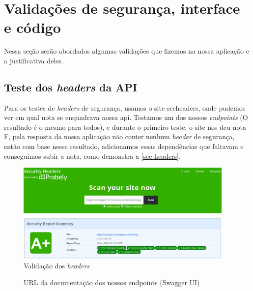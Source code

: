 \section{Validações de segurança, interface e código}
Nessa seção serão abordados algumas validações que fizemos na nossa aplicação e a justificativa deles.

\subsection{Teste dos \emph{headers} da API}
Para os testes de \emph{headers} de segurança, usamos o site \gls{secheaders}, onde pudemos ver em qual nota se enquadrava nossa \ac{api}. Testamos um dos nossos \emph{endpoints} (O resultado é o mesmo para todos), e durante o primeiro teste, o site nos deu nota F, pela resposta da nossa aplicação não conter nenhum \emph{header} de segurança, então com base nesse resultado, adicionamos essas dependências que faltavam e conseguimos subir a nota, como demonstra a \autoref{sec-headers}.

\begin{figure}[H]
	\centering
	\caption{\label{sec-headers}Validação dos \emph{headers}}
	\includegraphics[width=0.95\textwidth]{../imagens/web-tests/grade-security-headers.png}
\end{figure}

\begin{figure}[htb]
	\caption{\label{qr-url-swagger}URL da documentação dos nossos endpoints (Swagger UI)}
	\begin{center}
	\end{center}
\end{figure}

